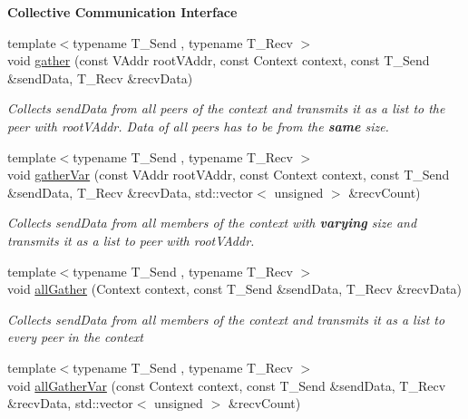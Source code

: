 \begin{Indent}{\bf Collective Communication Interface}\par
\begin{DoxyCompactItemize}
\item 
{\footnotesize template$<$typename T\+\_\+\+Send , typename T\+\_\+\+Recv $>$ }\\void \hyperlink{structgraybat_1_1communicationPolicy_1_1BMPI_a37fcb4dced08f33b4eee2adabf25fe0f}{gather} (const V\+Addr root\+V\+Addr, const Context context, const T\+\_\+\+Send \&send\+Data, T\+\_\+\+Recv \&recv\+Data)
\begin{DoxyCompactList}\small\item\em Collects {\itshape send\+Data} from all peers of the {\itshape context} and transmits it as a list to the peer with {\itshape root\+V\+Addr}. Data of all peers has to be from the {\bfseries same} size. \end{DoxyCompactList}\item 
{\footnotesize template$<$typename T\+\_\+\+Send , typename T\+\_\+\+Recv $>$ }\\void \hyperlink{structgraybat_1_1communicationPolicy_1_1BMPI_a772c45a8a2ec8ae749fef75ca2439cee}{gather\+Var} (const V\+Addr root\+V\+Addr, const Context context, const T\+\_\+\+Send \&send\+Data, T\+\_\+\+Recv \&recv\+Data, std\+::vector$<$ unsigned $>$ \&recv\+Count)
\begin{DoxyCompactList}\small\item\em Collects {\itshape send\+Data} from all members of the {\itshape context} with {\bfseries varying} size and transmits it as a list to peer with {\itshape root\+V\+Addr}. \end{DoxyCompactList}\item 
{\footnotesize template$<$typename T\+\_\+\+Send , typename T\+\_\+\+Recv $>$ }\\void \hyperlink{structgraybat_1_1communicationPolicy_1_1BMPI_abadfee42ac90516c1158292da79b0345}{all\+Gather} (Context context, const T\+\_\+\+Send \&send\+Data, T\+\_\+\+Recv \&recv\+Data)
\begin{DoxyCompactList}\small\item\em Collects {\itshape send\+Data} from all members of the {\itshape context} and transmits it as a list to every peer in the {\itshape context} \end{DoxyCompactList}\item 
{\footnotesize template$<$typename T\+\_\+\+Send , typename T\+\_\+\+Recv $>$ }\\void \hyperlink{structgraybat_1_1communicationPolicy_1_1BMPI_a0a365caf09acb118502623527c70668e}{all\+Gather\+Var} (const Context context, const T\+\_\+\+Send \&send\+Data, T\+\_\+\+Recv \&recv\+Data, std\+::vector$<$ unsigned $>$ \&recv\+Count)

\end{DoxyCompactItemize}
\end{Indent}

